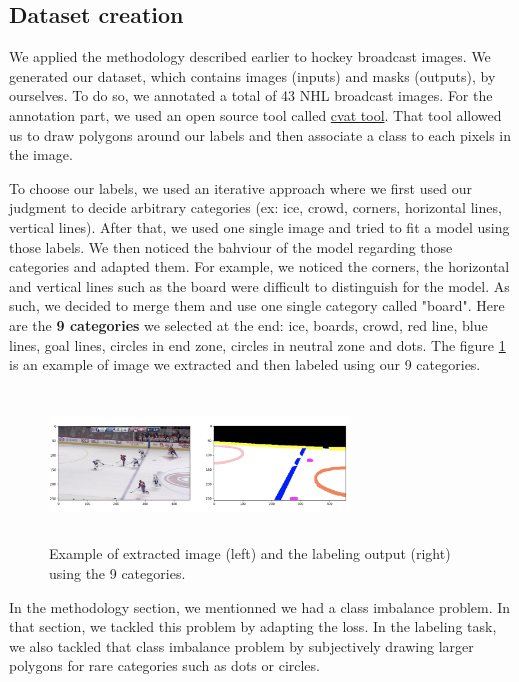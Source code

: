 \subsection{Dataset creation}
We applied the methodology described earlier to hockey broadcast images. We generated our dataset, which contains images (inputs) and masks (outputs), by ourselves. To do so, we annotated a total of 43 NHL broadcast images. For the annotation part, we used an open source tool called \href{https://github.com/opencv/cvat}{cvat tool}. That tool allowed us to draw polygons around our labels and then associate a class to each pixels in the image.

To choose our labels, we used an iterative approach where we first used our judgment to decide arbitrary categories (ex: ice, crowd, corners, horizontal lines, vertical lines). After that, we used one single image and tried to fit a model using those labels. We then noticed the bahviour of the model regarding those categories and adapted them. For example, we noticed the corners, the horizontal and vertical lines such as the board were difficult to distinguish for the model. As such, we decided to merge them and use one single category called "board". Here are the \textbf{9 categories} we selected at the end: ice, boards, crowd, red line, blue lines, goal lines, circles in end zone, circles in neutral zone and dots. The figure \ref{fig:labeling} is an example of image we extracted and then labeled using our 9 categories.

\begin{figure}[H]
	\centering
	\includegraphics[width=8cm, height=4cm]{figures/labeling-example.png}
	\caption{Example of extracted image (left) and the labeling output (right) using the 9 categories.}
	\label{fig:labeling}
\end{figure}

In the methodology section, we mentionned we had a class imbalance problem. In that section, we tackled this problem by adapting the loss. In the labeling task, we also tackled that class imbalance problem by subjectively drawing larger polygons for rare categories such as dots or circles.
